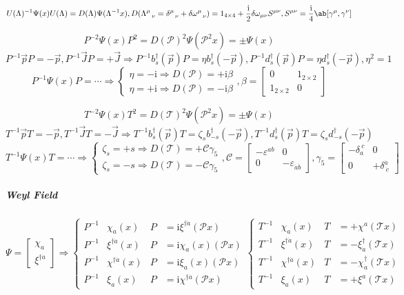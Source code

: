 \documentclass{article}
\newcommand{\bmat}[1]{\begin{bmatrix}#1\end{bmatrix}}
\newcommand{\calC}{\mathcal{C}}
\newcommand{\calP}{\mathcal{P}}
\newcommand{\calT}{\mathcal{T}}
\newcommand{\gammafive}{\gamma_5}
\newcommand{\gammamu}{\gamma^{\mu}}
\newcommand{\gammanu}{\gamma^{\nu}}
\newcommand{\rmi}{\mathrm{i}}
\newcommand{\Smunu}{S^{\mu\nu}}
\newcommand{\vecp}{\vec{p}}
\begin{document}
\[ U(\Lambda)^{-1} \Psi(x) U(\Lambda) = D(\Lambda) \Psi(\Lambda^{-1}x), D(\Lambda^{\mu}_{\ \ \nu} = \delta^{\mu}_{\ \ \nu} + \delta\omega^{\mu}_{\ \ \nu}) = 1_{4 \times 4} + \frac{\rmi}{2} \delta\omega_{\mu\nu} \Smunu, \Smunu = \frac{\rmi}{4} \ab[\gammamu, \gammanu] \]

\[ P^{-2} \Psi(x) P^2 = D(\calP)^2 \Psi(\calP^2 x) = \pm \Psi(x) \]
\[ P^{-1} \vecp P = - \vecp, P^{-1} \vec{J} P = + \vec{J} \Rightarrow P^{-1} b_s^{\dagger}(\vecp) P = \eta b_s^{\dagger}(- \vecp), P^{-1} d_s^{\dagger}(\vecp) P = \eta d_s^{\dagger}(- \vecp), \eta^2 = 1 \]
\[ P^{-1} \Psi(x) P = \cdots \Rightarrow \begin{cases}
        \eta = - \rmi \Rightarrow D(\calP) = + \rmi \beta \\
        \eta = + \rmi \Rightarrow D(\calP) = - \rmi \beta
    \end{cases} ,\beta = \bmat{0 & 1_{2 \times 2} \\ 1_{2 \times 2} & 0} \]

\[ T^{-2} \Psi(x) T^2 = D(\calT)^2 \Psi(\calP^2 x) = \pm \Psi(x) \]
\[ T^{-1} \vecp T = - \vecp, T^{-1} \vec{J} T = - \vec{J} \Rightarrow T^{-1} b_s^{\dagger}(\vecp) T = \zeta_s b_{-s}^{\dagger}(- \vecp), T^{-1} d_s^{\dagger}(\vecp) T = \zeta_s d_{-s}^{\dagger}(- \vecp) \]
\[ T^{-1} \Psi(x) T = \cdots \Rightarrow \begin{cases}
        \zeta_s = + s \Rightarrow D(\calT) = + \calC \gammafive \\
        \zeta_s = - s \Rightarrow D(\calT) = - \calC \gammafive
    \end{cases}, \calC = \bmat{- \varepsilon^{ab} & 0 \\ 0 & - \varepsilon_{\dot{a}\dot{b}}}, \gammafive = \bmat{- \delta_a^{\ c} & 0 \\ 0 & + \delta^{\dot{a}}_{\ \dot{c}}} \]

\subparagraph{Weyl Field}

\[ \Psi = \bmat{\chi_a \\ \xi^{\dagger \dot{a}}} \Rightarrow \left\{\begin{alignedat}{3}
        P^{-1} & \chi_a(x)                 & P & = \rmi \xi^{\dagger \dot{a}}(\calP x)  \\
        P^{-1} & \xi^{\dagger \dot{a}}(x)  & P & = \rmi \chi_a(x) (\calP x)             \\
        P^{-1} & \chi^{\dagger \dot{a}}(x) & P & = \rmi \xi_a(x) (\calP x)              \\
        P^{-1} & \xi_a(x)                  & P & = \rmi \chi^{\dagger \dot{a}}(\calP x)
    \end{alignedat}\right. \left\{\begin{alignedat}{3}
        T^{-1} & \chi_a(x)                 & T & = + \chi^a (\calT x)  \\
        T^{-1} & \xi^{\dagger \dot{a}}(x)  & T & = - \xi_{\dot{a}}^{\dagger} (\calT x)             \\
        T^{-1} & \chi^{\dagger \dot{a}}(x) & T & = - \chi_{\dot{a}}^{\dagger} (\calT x)              \\
        T^{-1} & \xi_a(x)                  & T & = + \xi^a (\calT x)
    \end{alignedat}\right. \]
\end{document}
